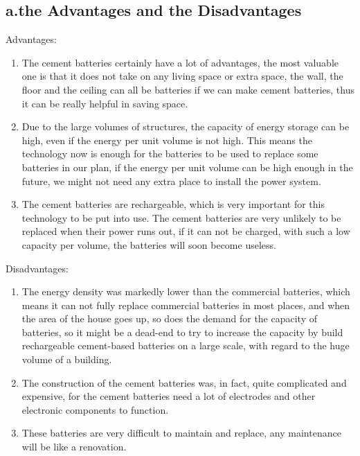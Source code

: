 \documentclass{article}
\begin{document}
\subsection{a.the Advantages and the Disadvantages}
Advantages:
\begin{enumerate}
    \item The cement batteries certainly have a lot of advantages, the most valuable one is that it does not take on any living space or extra space, the wall, the floor and the ceiling can all be batteries if we can make cement batteries,
          thus it can be really helpful in saving space.
    \item Due to the large volumes of structures, the capacity of energy storage can be high, even if the energy per unit volume is not high. This means the technology now is enough for the batteries to be used to replace some batteries in our plan, if the energy per unit volume can be high enough in the future, we might not need any extra place to install the power system.
    \item The cement batteries are rechargeable, which is very important for this technology to be put into use. The cement batteries are very unlikely to be replaced when their power runs out, if it can not be charged, with such a low capacity per volume, the batteries will soon become useless.
\end{enumerate}
Disadvantages:
\begin{enumerate}
    \item The energy density was markedly lower than the commercial batteries, which means it can not fully replace commercial batteries in most places, and when the area of the house goes up, so does the demand for the capacity of batteries, so it might be a dead-end to try to increase the capacity by build rechargeable cement-based batteries on a
          large scale, with regard to the huge volume of a building.
    \item The construction of the cement batteries was, in fact, quite complicated and expensive, for the cement batteries need a lot of electrodes and other electronic components to function.

    \item These batteries are very difficult to maintain and replace, any maintenance will be like a renovation.
\end{enumerate}
\end{document}

